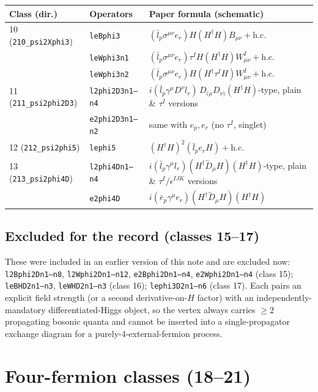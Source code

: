\documentclass[11pt,a4paper]{article}
\newcommand{\hc}{\text{h.c.}}
\begin{document}
\begin{center}
\begin{tabular}{@{}lll@{}}
\toprule
Class (dir.) & Operators & Paper formula (schematic) \\
\midrule
10 (\texttt{210\_psi2Xphi3})
  & \texttt{leBphi3} & $(\bar l_p\sigma^{\mu\nu}e_r) H (H^\dagger H) B_{\mu\nu} + \hc$ \\
  & \texttt{leWphi3n1} & $(\bar l_p\sigma^{\mu\nu}e_r)\tau^I H (H^\dagger H) W^I_{\mu\nu} + \hc$ \\
  & \texttt{leWphi3n2} & $(\bar l_p\sigma^{\mu\nu}e_r) H (H^\dagger \tau^I H) W^I_{\mu\nu} + \hc$ \\
\midrule
11 (\texttt{211\_psi2phi2D3})
  & \texttt{l2phi2D3n1--n4} & $i(\bar l_p\gamma^\mu D^\nu l_r)\, D_{(\mu}D_{\nu)}(H^\dagger H)$-type,
    plain \& $\tau^I$ versions \\
  & \texttt{e2phi2D3n1--n2} & same with $e_p,e_r$ (no $\tau^I$, singlet) \\
\midrule
12 (\texttt{212\_psi2phi5})
  & \texttt{lephi5} & $(H^\dagger H)^2(\bar l_p e_r H) + \hc$ \\
\midrule
13 (\texttt{213\_psi2phi4D})
  & \texttt{l2phi4Dn1--n4} & $i(\bar l_p\gamma^\mu l_r)(H^\dagger\overleftrightarrow D_\mu H)(H^\dagger H)$-type,
    plain \& $\tau^I/\epsilon^{IJK}$ versions \\
  & \texttt{e2phi4D} & $i(\bar e_p\gamma^\mu e_r)(H^\dagger\overleftrightarrow D_\mu H)(H^\dagger H)$ \\
\bottomrule
\end{tabular}
\end{center}

\subsection*{Excluded for the record (classes 15--17)}
These were included in an earlier version of this note and are excluded
now: \texttt{l2Bphi2Dn1--n8}, \texttt{l2Wphi2Dn1--n12},
\texttt{e2Bphi2Dn1--n4}, \texttt{e2Wphi2Dn1--n4} (class 15);
\texttt{leBHD2n1--n3}, \texttt{leWHD2n1--n3} (class 16);
\texttt{lephi3D2n1--n6} (class 17). Each pairs an explicit field strength
(or a second derivative-on-$H$ factor) with an independently-mandatory
differentiated-Higgs object, so the vertex always carries $\geq 2$
propagating bosonic quanta and cannot be inserted into a single-propagator
exchange diagram for a purely-4-external-fermion process.

\section{Four-fermion classes (18--21)}
\end{document}
